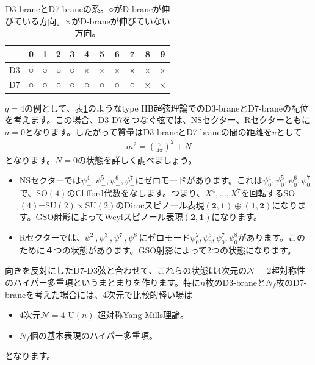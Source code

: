 \documentclass[report,paper=a4, fontsize=12pt, line_length=16cm, number_of_lines=34,dvipdfmx]{jlreq}
\numberwithin{equation}{chapter}
\numberwithin{equation}{section}
\newcommand{\Ncal}{\mathcal{N}}
\begin{document}
\begin{table}[htbp]
  \centering
  \begin{tabular}{|c||c|c|c|c|c|c|c|c|c|c|}\hline
    &0 &1 &2 &3 &4 &5 &6 &7 &8 &9 \\ \hline\hline
  D3&○&○&○&○&×&×&×&×&×&×\\ \hline    
  D7&○&○&○&○&○&○&○&○&×&×\\ \hline    
  \end{tabular}
  \caption{D3-braneとD7-braneの系。○がD-braneが伸びている方向。×がD-braneが伸びていない方向。}
  \label{tab:D3D7}
\end{table}
$q=4$の例として、表\ref{tab:D3D7}のようなtype IIB超弦理論でのD3-braneとD7-braneの配位を考えます。この場合、D3-D7をつなぐ弦では、NSセクター、Rセクターともに$a=0$となります。したがって質量はD3-braneとD7-braneの間の距離を$v$として
\begin{align}
  m^2=\left( \frac{v}{4\pi} \right)^2+N
\end{align}
となります。$N=0$の状態を詳しく調べましょう。
\begin{itemize}
  \item NSセクターでは$\psi_{-}^{4},\psi_{-}^{5},\psi_{-}^{6},\psi_{-}^{7}$にゼロモードがあります。これは$\psi_{0}^{4},\psi_{0}^{5},\psi_{0}^{6},\psi_{0}^{7}$で、SO$(4)$のClifford代数をなします。つまり、$X^{4},\dots,X^{7}$を回転するSO$(4)$=SU$(2)\times$SU$(2)$のDiracスピノール表現$(\mathbf{2},\mathbf{1})\oplus(\mathbf{1},\mathbf{2})$になります。GSO射影によってWeylスピノール表現$(\mathbf{2},\mathbf{1})$になります。
  \item Rセクターでは、$\psi_{-}^{2},\psi_{-}^{3},\psi_{-}^{7},\psi_{-}^{8}$にゼロモード$\psi_{0}^{2},\psi_{0}^{3},\psi_{0}^{7},\psi_{0}^{8}$があります。このために４つの状態があります。GSO射影によって2つの状態になります。
\end{itemize}
向きを反対にしたD7-D3弦と合わせて、これらの状態は4次元の$\Ncal=2$超対称性のハイパー多重項というまとまりを作ります。特に$n$枚のD3-braneと$N_f$枚のD7-braneを考えた場合には、4次元で比較的軽い場は
\begin{itemize}
  \item 4次元$\Ncal=4$ U$(n)$ 超対称Yang-Mills理論。
  \item $N_f$個の基本表現のハイパー多重項。
\end{itemize}
となります。
\end{document}
